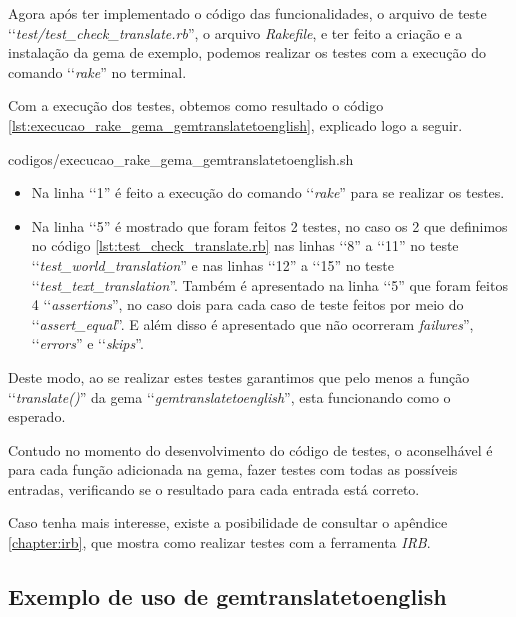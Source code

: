Agora após ter implementado o código das funcionalidades, o arquivo de teste
‘‘\emph{test/test\_check\_translate.rb}'', o arquivo \emph{Rakefile}, e ter feito a criação e a instalação
da gema de exemplo, podemos realizar os testes com a execução do comando ‘‘\emph{rake}'' no terminal.

Com a execução dos testes, obtemos como resultado o código \ref{lst:execucao_rake_gema_gemtranslatetoenglish},
explicado logo a seguir.


{codigos/execucao_rake_gema_gemtranslatetoenglish.sh }

\begin{itemize}

 \item Na linha ‘‘1'' é feito a execução do comando ‘‘\emph{rake}'' para se realizar os testes.

 \item Na linha ‘‘5'' é mostrado que foram feitos 2 testes, no caso os 2 que definimos no código
 \ref{lst:test_check_translate.rb} nas linhas ‘‘8'' a ‘‘11'' no teste ‘‘\emph{test\_world\_translation}''
 e nas linhas ‘‘12'' a ‘‘15'' no teste ‘‘\emph{test\_text\_translation}''. Também é apresentado na
 linha ‘‘5'' que foram feitos 4 ‘‘\emph{assertions}'', no caso dois para cada caso de teste feitos por
 meio do ‘‘\emph{assert\_equal}''. E além disso é apresentado que não ocorreram  \emph{failures}'',
 ‘‘\emph{errors}'' e ‘‘\emph{skips}''.

\end{itemize}

Deste modo, ao se realizar estes testes garantimos que pelo menos a função ‘‘\emph{translate()}'' da gema
‘‘\emph{gemtranslatetoenglish}'', esta funcionando como o esperado.

Contudo no momento do desenvolvimento do código de testes, o aconselhável é para cada função adicionada
na gema, fazer testes com todas as possíveis entradas, verificando se o resultado para cada entrada
está correto.

Caso tenha mais interesse, existe a posibilidade de consultar o apêndice \ref{chapter:irb}, que mostra
como realizar testes com a ferramenta \emph{IRB}.


\subsection{Exemplo de uso de gemtranslatetoenglish}
\label{subsection:exemplo_de_uso_de_gemtranslatetoenglish}

